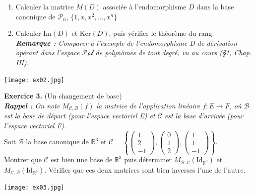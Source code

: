 \documentclass[a4paper, 10pt]{report}
\begin{document}
	\begin{enumerate}[label=\arabic*.]
		\item Calculer la matrice $M(D)$ associée à l'endomorphisme $D$
		dans la base canonique de $\mathcal{P}_n$,
		$\{1, x, x^2, \dotsc, x^n\}$
		\item Calculer $\mathrm{Im}(D)$ et $\mathrm{Ker}(D)$, puis
		vérifier le théorème du rang.\\
		\textit{\textbf{Remarque :} Comparer à l'exemple de l'endomorphisme
			D de dérivation opérant dans l'espace $\mathcal{Pol}$ de
			polynômes de tout degré, vu au cours (§1, Chap. III).}
	\end{enumerate}
	
	\texttt{[image: ex02.jpg]}
		
	\vspace{5mm}
	\noindent
	\textbf{Exercice 3.} (Un changement de base)\\
	\textit{\textbf{Rappel :} On note $M_{\mathcal{C,B}}(f)$ la matrice
		de l'application linéaire $f: E \to F$, où $\mathcal{B}$ est la
		base de départ (pour l'espace vectoriel E) et $\mathcal{C}$ est
		la base d'arrivée (pour l'espace vectoriel F).}\\
		
	\noindent	
	Soit $\mathcal{B}$ la base canonique de $\mathbb{R}^3$ et
	$\mathcal{C} = 
		\left\{
		\begin{pmatrix}	1\\2\\-1 \end{pmatrix},
		\begin{pmatrix}	0\\1\\2 \end{pmatrix},
		\begin{pmatrix}	1\\1\\-1 \end{pmatrix}
		\right\}$.\\
	
	\noindent
	Montrer que $\mathcal{C}$ est bien une base de $\mathbb{R}^3$
	puis déterminer $M_{\mathcal{B,C}}(\mathrm{Id}_{\mathbb{R}^3})$
	et $M_{\mathcal{C,B}}(\mathrm{Id}_{\mathbb{R}^3})$. Vérifier que
	ces deux matrices sont bien inverses l'une de l'autre.
		
	\texttt{[image: ex03.jpg]}
	
	\newpage
	
\end{document}
